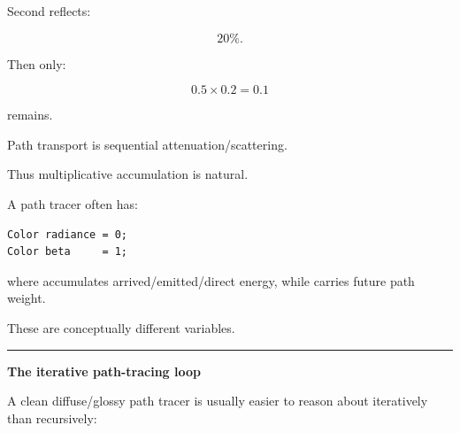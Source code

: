 Second reflects:

\[
20\%.
\]

Then only:

\[
0.5\times0.2=0.1
\]

remains.

Path transport is sequential attenuation/scattering.

Thus multiplicative accumulation is natural.

A path tracer often has:

\begin{verbatim}
Color radiance = 0;
Color beta     = 1;
\end{verbatim}

where  accumulates arrived/emitted/direct energy, while  carries future path weight.

These are conceptually different variables.

\begin{center}\rule{0.5\linewidth}{0.5pt}\end{center}

\textbf{The iterative path-tracing loop}

A clean diffuse/glossy path tracer is usually easier to reason about iteratively than recursively:

